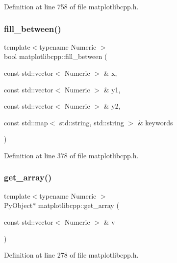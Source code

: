 Definition at line 758 of file matplotlibcpp.\+h.

\mbox{\label{namespacematplotlibcpp_a928fb4c83f29554b1b37aeea7af9bb73}} 
\subsubsection{\texorpdfstring{fill\_between()}{fill\_between()}}
{\footnotesize\ttfamily template$<$typename Numeric $>$ \\
bool matplotlibcpp\+::fill\+\_\+between (\begin{DoxyParamCaption}\item[{const std\+::vector$<$ Numeric $>$ \&}]{x,  }\item[{const std\+::vector$<$ Numeric $>$ \&}]{y1,  }\item[{const std\+::vector$<$ Numeric $>$ \&}]{y2,  }\item[{const std\+::map$<$ std\+::string, std\+::string $>$ \&}]{keywords }\end{DoxyParamCaption})}



Definition at line 378 of file matplotlibcpp.\+h.

\mbox{\label{namespacematplotlibcpp_a62d86e190f22181acf7ead76bd57497f}} 
\subsubsection{\texorpdfstring{get\_array()}{get\_array()}}
{\footnotesize\ttfamily template$<$typename Numeric $>$ \\
Py\+Object$\ast$ matplotlibcpp\+::get\+\_\+array (\begin{DoxyParamCaption}\item[{const std\+::vector$<$ Numeric $>$ \&}]{v }\end{DoxyParamCaption})}



Definition at line 278 of file matplotlibcpp.\+h.

\mbox{\label{namespacematplotlibcpp_ae0bbf80e73099a91df28e4fb871b166a}} 
